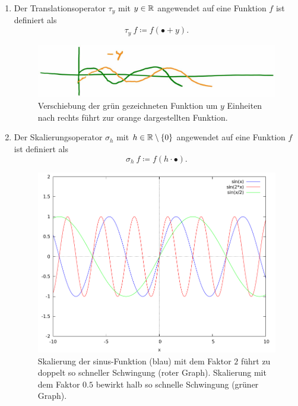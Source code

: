 \begin{definition} \leavevmode
\begin{enumerate}
\item Der Translationsoperator $ \tau_{y} $ mit $ y \in \mathbb{R} $ angewendet auf eine Funktion $ f $ ist 
definiert als
\[ \tau_{y} \ f \coloneqq f(\bullet + y). \]
\begin{figure}[h]
	\centering
	\includegraphics[width=0.5\linewidth]{Bilder/translation}
	\caption{Verschiebung der grün gezeichneten Funktion um $ y $ Einheiten nach rechts führt zur
  	orange dargestellten Funktion.}
	\label{fig:translation}
\end{figure}
\item Der Skalierungsoperator $ \sigma_{h} $ mit $ h \in \mathbb{R} \setminus \{ 0 \} $ angewendet auf eine 
Funktion $ f $ ist definiert als
\[ \sigma_{h} \ f \coloneqq f(h \cdot \bullet). \]
\begin{figure}[ht]
	\centering
	\includegraphics[width=0.5\linewidth]{Bilder/Skalierung.png}
	\caption{Skalierung der sinus-Funktion (blau) mit dem Faktor $ 2 $ führt zu doppelt so schneller
  	Schwingung (roter Graph). Skalierung mit dem Faktor $ 0.5 $ bewirkt halb so schnelle
  	Schwingung (grüner Graph).}
	\label{fig:skalierung}
\end{figure}
\end{enumerate}
\end{definition}

